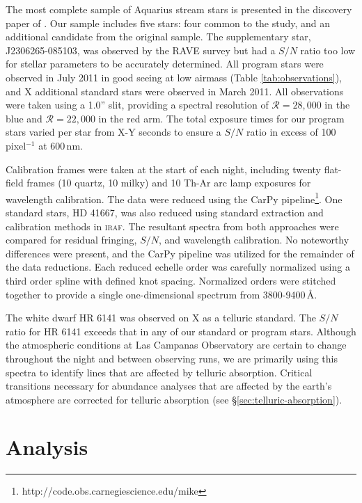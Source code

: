 \documentclass{emulateapj}
\begin{document}
The most complete sample of Aquarius stream stars is presented in the discovery paper of \citet{williams;et-al_2011}. Our sample includes five stars: four common to the \citet{wylie-de-boer;et-al_2012} study, and an additional candidate from the original \citet{williams;et-al_2011} sample. The supplementary star, J2306265-085103, was observed by the RAVE survey but had a $S/N$ ratio too low for stellar parameters to be accurately determined. All program stars were observed in July 2011 in good seeing at low airmass (Table \ref{tab:observations}), and X additional standard stars were observed in March 2011. All observations were taken using a 1.0'' slit, providing a spectral resolution of $\mathcal{R} = 28,000$ in the blue and $\mathcal{R} = 22,000$ in the red arm. The total exposure times for our program stars varied per star from X-Y seconds to ensure a $S/N$ ratio in excess of 100\,pixel$^{-1}$ at 600\,nm.


Calibration frames were taken at the start of each night, including twenty flat-field frames (10 quartz, 10 milky) and 10 Th-Ar arc lamp exposures for wavelength calibration. The data were reduced using the CarPy pipeline\footnote{http://code.obs.carnegiescience.edu/mike}. One standard stars, HD 41667, was also reduced using standard extraction and calibration methods in \textsc{iraf}. The resultant spectra from both approaches were compared for residual fringing, $S/N$, and wavelength calibration. No noteworthy differences were present, and the CarPy pipeline was utilized for the remainder of the data reductions. Each reduced echelle order was carefully normalized using a third order spline with defined knot spacing. Normalized orders were stitched together to provide a single one-dimensional spectrum from 3800-9400\,\AA{}. 
 
The white dwarf HR 6141 was observed on X as a telluric standard. The $S/N$ ratio for HR 6141 exceeds that in any of our standard or program stars. Although the atmospheric conditions at Las Campanas Observatory are certain to change throughout the night and between observing runs, we are primarily using this spectra to identify lines that are affected by telluric absorption. Critical transitions necessary for abundance analyses that are affected by the earth's atmosphere are corrected for telluric absorption (see \S\ref{sec:telluric-absorption}).

\section{Analysis}
\label{sec:analysis}
\end{document}
